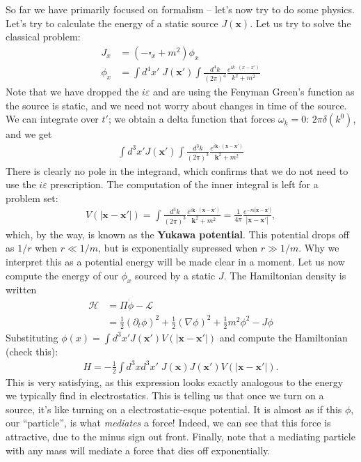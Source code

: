 \documentclass{../mathnotes}
\begin{document}
So far we have primarily focused on formalism -- let's now try to do some physics. Let's try to calculate the energy of a static source $J(\mathbf{x})$.
Let us try to solve the classical problem:
\begin{align*}
    J_x&=\left( -\square_x+m^2 \right)\phi_x\\
    \phi_x&=\int d^4x'\;J(\mathbf{x}') \int \frac{d^4k}{(2\pi)^4}\frac{e^{ik\cdot(x-x')}}{k^2+m^2}
\end{align*}
Note that we have dropped the $i\varepsilon$ and are using the Fenyman Green's function as the source is static, and we need not worry about changes
in time of the source. We can integrate over $t'$; we obtain a delta function that forces $\omega_k=0$: $2\pi\delta(k^0)$, and we get
\begin{align*}
    \int d^3x' J(\mathbf{x}') \int \frac{d^3k}{(2\pi)^3}\frac{e^{i\mathbf{k}\cdot(\mathbf{x}-\mathbf{x'})}}{\mathbf{k}^2+m^2}
\end{align*}
There is clearly no pole in the integrand, which confirms that we do not need to use the $i\varepsilon$ prescription. The computation of the inner integral
is left for a problem set:
\begin{align*}
    V(|\mathbf{x}-\mathbf{x}'|)=\int \frac{d^3k}{(2\pi)^3}\frac{e^{i\mathbf{k}\cdot(\mathbf{x}-\mathbf{x'})}}{\mathbf{k}^2+m^2}=\frac{1}{4\pi}\frac{e^{-m|\mathbf{x}-\mathbf{x}'|}}{|\mathbf{x}-\mathbf{x}'|},
\end{align*}
which, by the way, is known as the \textbf{Yukawa potential}. This potential drops off as $1/r$ when $r\ll 1/m$, but is exponentially supressed when $r\gg 1/m$.
Why we interpret this as a potential energy will be made clear in a moment. Let us now compute the energy of our $\phi_x$ sourced by a static $J$.
The Hamiltonian density is written
\begin{align*}
    \mathcal{H}&=\Pi\dot\phi-\mathcal{L}\\
    &=\frac{1}{2}(\partial_t\phi)^2+\frac{1}{2}(\nabla\phi)^2+\frac{1}{2}m^2\phi^2-J\phi
\end{align*}
Substituting $\phi(x)=\int d^3x' J(\mathbf{x}')V(|\mathbf{x}-\mathbf{x}'|)$ and compute the Hamiltonian (check this):
\begin{align*}
    H=-\frac{1}{2}\int d^3x d^3x'\;J(\mathbf{x})J(\mathbf{x}')V(|\mathbf{x}-\mathbf{x}'|).
\end{align*}
This is very satisfying, as this expression looks exactly analogous to the energy we typically find in electrostatics. This is telling us that once
we turn on a source, it's like turning on a electrostatic-esque potential. It is almost as if this $\phi$, our ``particle'', is what \textit{mediates}
a force! Indeed, we can see that this force is attractive, due to the minus sign out front. Finally, note that a mediating particle with any mass
will mediate a force that dies off exponentially.
\end{document}

